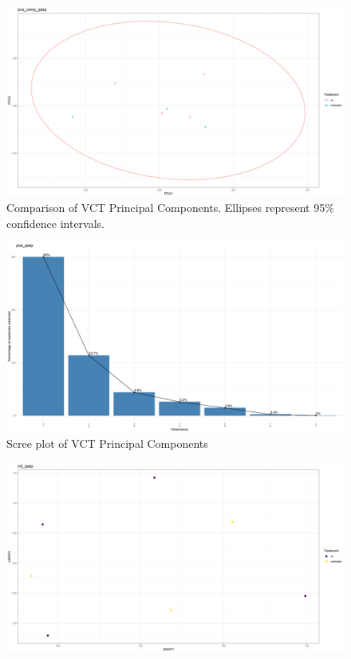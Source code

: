 \documentclass[12pt,final,CPage]{ufthesis}
\begin{document}
{\begin{figure}
  {\centering \includegraphics[width=1\linewidth]{figure/rrv_volatiles_comparison_pca_comp_qsep} 

  }

  \caption{Comparison of VCT Principal Components. Ellipses represent 95\% confidence intervals.}\label{fig:qsep-vocs-compares}
  \end{figure}
  \begin{figure}

  {\centering \includegraphics[width=1\linewidth]{figure/rrv_volatiles_screeplot_pca_qsep} 

  }

  \caption{Scree plot of VCT Principal Components}\label{fig:qsep-vocs-scree}
  \end{figure}
  \begin{figure}

  {\centering \includegraphics[width=1\linewidth]{figure/rrv_volatiles_umap_rrd_qsep} 

}
\end{figure}}
\end{document}
